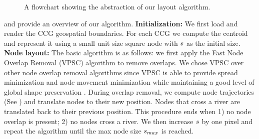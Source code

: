 {\begin{figure}[tb!]
    \caption{A flowchart showing the abstraction of our layout algorithm.}
    \label{fig:flowchart}
\end{figure}
}

 and  provide an overview of our algorithm. \textbf{Initialization:} We first load and render the CCG geospatial boundaries. For each CCG we compute the centroid and represent it using a small unit size square node with $ s $ as the initial size. \textbf{Node layout:} The basic algorithm is as follows: we first apply the Fast Node Overlap Removal (VPSC) algorithm \cite{dwyer2006fast} to remove overlaps. We chose VPSC over other node overlap removal algorithms since VPSC is able to provide spread minimization and node movement minimization while maintaining a good level of global shape preservation \cite{chen2020Node}. During overlap removal, we compute node trajectories (See ) and translate nodes to their new position. Nodes that cross a river are translated back to their previous position. This procedure ends when 1) no node overlap is present; 2) no nodes cross a river. We then increase $ s $ by one pixel and repeat the algorithm until the max node size $ s_{max} $ is reached. 


